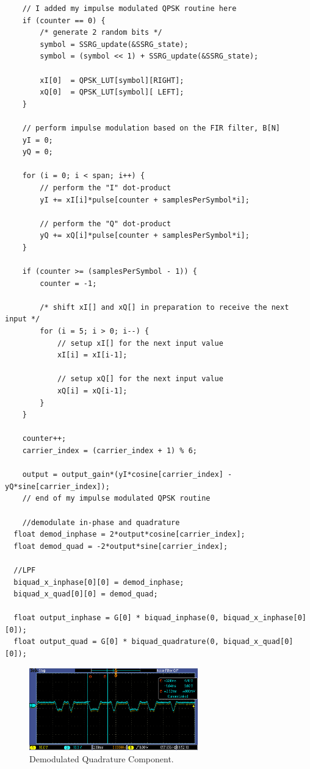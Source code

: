 \documentclass{article}
\begin{document}
\begin{verbatim}
	// I added my impulse modulated QPSK routine here
	if (counter == 0) {
		/* generate 2 random bits */
		symbol = SSRG_update(&SSRG_state); 
		symbol = (symbol << 1) + SSRG_update(&SSRG_state);

		xI[0]  = QPSK_LUT[symbol][RIGHT];  
		xQ[0]  = QPSK_LUT[symbol][ LEFT];   
	}

	// perform impulse modulation based on the FIR filter, B[N]
	yI = 0;
	yQ = 0;

	for (i = 0; i < span; i++) {
		// perform the "I" dot-product
		yI += xI[i]*pulse[counter + samplesPerSymbol*i];	

		// perform the "Q" dot-product
		yQ += xQ[i]*pulse[counter + samplesPerSymbol*i];	
	}

	if (counter >= (samplesPerSymbol - 1)) {
		counter = -1; 

		/* shift xI[] and xQ[] in preparation to receive the next input */
		for (i = 5; i > 0; i--) {
			// setup xI[] for the next input value
			xI[i] = xI[i-1];  

			// setup xQ[] for the next input value
			xQ[i] = xQ[i-1];  
		}
	}

	counter++;
	carrier_index = (carrier_index + 1) % 6;

	output = output_gain*(yI*cosine[carrier_index] - yQ*sine[carrier_index]);
	// end of my impulse modulated QPSK routine

	//demodulate in-phase and quadrature
  float demod_inphase = 2*output*cosine[carrier_index];
  float demod_quad = -2*output*sine[carrier_index];

  //LPF
  biquad_x_inphase[0][0] = demod_inphase;
  biquad_x_quad[0][0] = demod_quad;

  float output_inphase = G[0] * biquad_inphase(0, biquad_x_inphase[0][0]);
  float output_quad = G[0] * biquad_quadrature(0, biquad_x_quad[0][0]);
\end{verbatim}

\begin{figure}[h]
  \begin{center}
    \includegraphics[width=0.65\textwidth]{img/task_2_c_oscilloscope.png}
    \caption{Demodulated Quadrature Component.}
  \end{center}
\end{figure}
\end{document}
